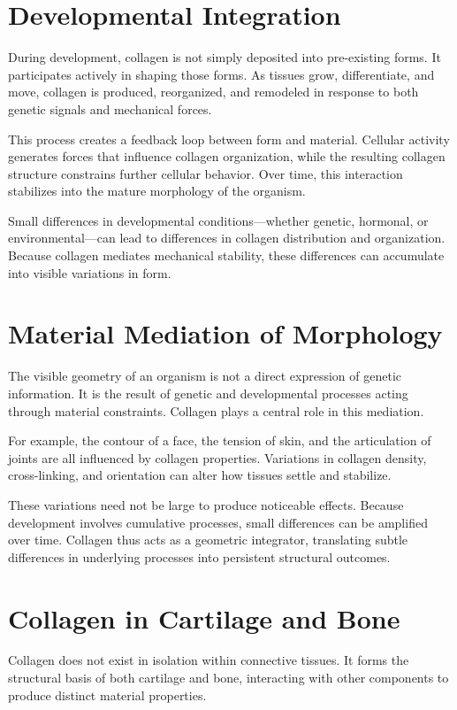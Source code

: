 \documentclass[11pt,oneside]{book}
\begin{document}
\section{Developmental Integration}

During development, collagen is not simply deposited into pre-existing forms. It participates actively in shaping those forms. As tissues grow, differentiate, and move, collagen is produced, reorganized, and remodeled in response to both genetic signals and mechanical forces.

This process creates a feedback loop between form and material. Cellular activity generates forces that influence collagen organization, while the resulting collagen structure constrains further cellular behavior. Over time, this interaction stabilizes into the mature morphology of the organism.

Small differences in developmental conditions—whether genetic, hormonal, or environmental—can lead to differences in collagen distribution and organization. Because collagen mediates mechanical stability, these differences can accumulate into visible variations in form.

\section{Material Mediation of Morphology}

The visible geometry of an organism is not a direct expression of genetic information. It is the result of genetic and developmental processes acting through material constraints. Collagen plays a central role in this mediation.

For example, the contour of a face, the tension of skin, and the articulation of joints are all influenced by collagen properties. Variations in collagen density, cross-linking, and orientation can alter how tissues settle and stabilize.

These variations need not be large to produce noticeable effects. Because development involves cumulative processes, small differences can be amplified over time. Collagen thus acts as a geometric integrator, translating subtle differences in underlying processes into persistent structural outcomes.

\section{Collagen in Cartilage and Bone}

Collagen does not exist in isolation within connective tissues. It forms the structural basis of both cartilage and bone, interacting with other components to produce distinct material properties.
\end{document}
